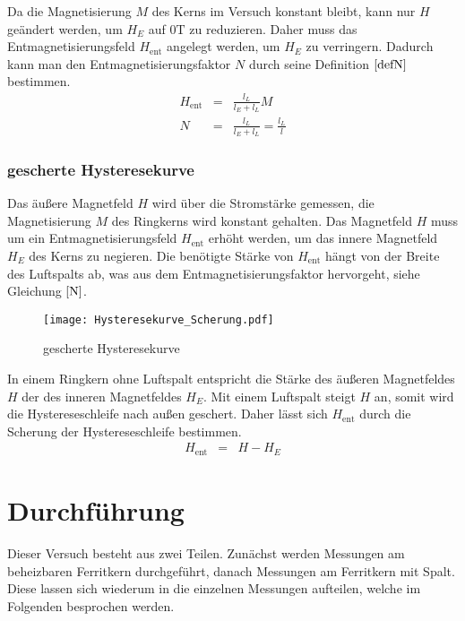 \documentclass[12pt,a4paper]{scrartcl}
\numberwithin{equation}{section} %
\newcommand{\pu}[1]{\ensuremath{\mathrm{#1}}}
\renewcommand{\[}{} %
\renewcommand{\]}{\noindent} %
\begin{document}
Da die Magnetisierung \(M\) des Kerns im Versuch konstant bleibt, kann
nur \(H\) geändert werden, um \(H_E\) auf \(\pu{0T}\) zu reduzieren.
Daher muss das Entmagnetisierungsfeld \(H_\mathrm{ent}\) angelegt
werden, um \(H_E\) zu verringern. Dadurch kann man den
Entmagnetisierungsfaktor \(N\) durch seine Definition \(\eqref{defN}\)
bestimmen. \[
\begin{eqnarray}
    H_\mathrm{ent} &=& \frac{l_L}{l_E+l_L} M \\
    N &=& \frac{l_L}{l_E+l_L} = \frac{l_L}{l}
\end{eqnarray}
\]

\hypertarget{gescherte-hysteresekurve}{%
\subsubsection{gescherte
Hysteresekurve}\label{gescherte-hysteresekurve}}

Das äußere Magnetfeld \(H\) wird über die Stromstärke gemessen, die
Magnetisierung \(M\) des Ringkerns wird konstant gehalten. Das
Magnetfeld \(H\) muss um ein Entmagnetisierungsfeld \(H_\mathrm{ent}\)
erhöht werden, um das innere Magnetfeld \(H_E\) des Kerns zu negieren.
Die benötigte Stärke von \(H_\mathrm{ent}\) hängt von der Breite des
Luftspalts ab, was aus dem Entmagnetisierungsfaktor hervorgeht, siehe
Gleichung \(\eqref{N}\).

\begin{figure}
\centering
\texttt{[image: Hysteresekurve\_Scherung.pdf]}
\caption{gescherte Hysteresekurve}
\end{figure}

In einem Ringkern ohne Luftspalt entspricht die Stärke des äußeren
Magnetfeldes \(H\) der des inneren Magnetfeldes \(H_E\). Mit einem
Luftspalt steigt \(H\) an, somit wird die Hystereseschleife nach außen
geschert. Daher lässt sich \(H_\mathrm{ent}\) durch die Scherung der
Hystereseschleife bestimmen. \[
\begin{eqnarray}
    H_\mathrm{ent} &=& H - H_E \label{Hscher}
\end{eqnarray}
\]

\hypertarget{durchfuxfchrung}{%
\section{Durchführung}\label{durchfuxfchrung}}

Dieser Versuch besteht aus zwei Teilen. Zunächst werden Messungen am
beheizbaren Ferritkern durchgeführt, danach Messungen am Ferritkern mit
Spalt. Diese lassen sich wiederum in die einzelnen Messungen aufteilen,
welche im Folgenden besprochen werden.
\end{document}
